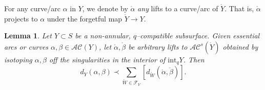 \documentclass[11pt,letterpaper]{amsart}
\newcommand{\dfnote}[1]{\todo[color=darkgreen,linecolor=darkgreen,size= \footnotesize]{#1}}
\newcommand{\sing}{\mathrm{sing}}
\newcommand{\mc}{\mathcal}
\newcommand{\mr}{\mathring}
\newcommand{\psub}{\mr W}
\numberwithin{equation}{section}
\newtheorem{lemma}[theorem]{Lemma}
\theoremstyle{definition}
\renewcommand{\setminus}{\smallsetminus}
\newcommand{\AC}{\mathcal{AC}}
\renewcommand{\int}{\mathrm{int}}
\begin{document}
%    
%    

For any curve/arc $\alpha$ in $Y$, we denote by $\mr \alpha$ \emph{any} lifts to a curve/arc of $\mr Y$. That is, $\mr \alpha$ projects to $\alpha$ under the forgetful map $\mr Y \to Y$.


\begin{lemma}\label{Lem:ShufflingLower}
Let  $Y \subset S$ be a non-annular, $q$--compatible subsurface. Given essential arcs or curves $\alpha, \beta \in \AC(Y)$, let $\mr \alpha, \mr \beta$ be arbitrary lifts to $\AC^s(\mr Y)$ obtained by isotoping $\alpha, \beta$ off the singularities in the interior of $\int_q Y$.
Then
\[
d_Y(\alpha, \beta) \prec \sum_{\psub \in \mc F_Y} \left[ d_{\psub} (\mr \alpha,  \mr \beta ) \right].
\]
\end{lemma}
\end{document}
